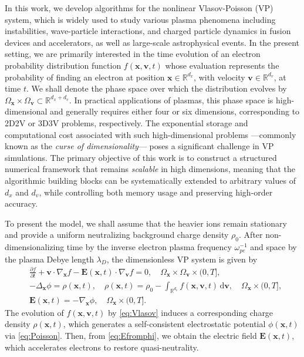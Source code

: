 \documentclass{article}
\theoremstyle{plain}
\theoremstyle{definition}
\theoremstyle{remark}
\begin{document}
In this work, we develop algorithms for the nonlinear Vlasov-Poisson (VP) system, which is widely used to study various plasma phenomena including instabilities, wave-particle interactions, and charged particle dynamics in fusion devices and accelerators, as well as large-scale astrophysical events. In the present setting, we are primarily interested in the time evolution of an electron probability distribution function $f(\bm{x}, \bm{v}, t)$ whose evaluation represents the probability of finding an electron at position $\bm{x} \in \mathbb{R}^{d_x}$, with velocity $\bm{v} \in \mathbb{R}^{d_v}$, at time $t$. We shall denote the phase space over which the distribution evolves by $\Omega_{\bm{x}} \times \Omega_{\bm{v}} \subset \mathbb{R}^{d_x + d_v}$. In practical applications of plasmas, this phase space is high-dimensional and generally requires either four or six dimensions, corresponding to 2D2V or 3D3V problems, respectively. The exponential storage and computational cost associated with such high-dimensional problems ---commonly known as the \emph{curse of dimensionality}--- poses a significant challenge in VP simulations. The primary objective of this work is to construct a structured numerical framework that remains \emph{scalable} in high dimensions, meaning that the algorithmic building blocks can be systematically extended to arbitrary values of $d_x$ and $d_v$, while controlling both memory usage and preserving high-order accuracy.

To present the model, we shall assume that the heavier ions remain stationary and provide a uniform neutralizing background charge density $\rho_{0}$. After non-dimensionalizing time by the inverse electron plasma frequency $\omega_{pe}^{-1}$ and space by the plasma Debye length $\lambda_{D}$, the dimensionless VP system is given by
\begin{align}
    &\frac{\partial f}{\partial t} + \bm{v} \cdot \nabla_{\bm{x}} f - \bm{E}(\bm{x}, t) \cdot \nabla_{\bm{v}} f = 0, \quad \Omega_{\bm{x}} \times \Omega_{\bm{v}} \times (0,T], 
    \label{eq:Vlasov} \\
    &-\Delta_{\bm{x}} \phi = \rho(\bm{x}, t), \quad
    \rho(\bm{x}, t) = \rho_0 - \int_{\mathbb{R}^{d_v}} f(\bm{x}, \bm{v}, t) \,\mathrm{d}\bm{v},
    \quad \Omega_{\bm{x}} \times (0,T], 
    \label{eq:Poisson} \\
    &\bm{E}(\bm{x},t) = -\nabla_{\bm{x}} \phi, 
    \quad \Omega_{\bm{x}} \times (0,T]. 
    \label{eq:Efromphi}
\end{align}
The evolution of $f(\bm{x},\bm{v},t)$ by \eqref{eq:Vlasov} induces a corresponding charge density $\rho(\bm{x},t)$, which generates a self-consistent electrostatic potential $\phi(\bm{x},t)$ via \eqref{eq:Poisson}. Then, from \eqref{eq:Efromphi}, we obtain the electric field $\bm{E}(\bm{x},t)$, which accelerates electrons to restore quasi-neutrality.
\end{document}
